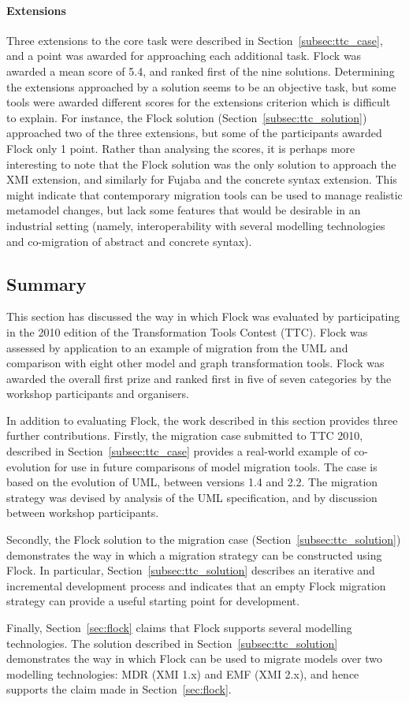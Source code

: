 \paragraph{Extensions} Three extensions to the core task were described in Section~\ref{subsec:ttc_case}, and a point was awarded for approaching each additional task. Flock was awarded a mean score of 5.4, and ranked first of the nine solutions. Determining the extensions approached by a solution seems to be an objective task, but some tools were awarded different scores for the extensions criterion which is difficult to explain. For instance, the Flock solution (Section~\ref{subsec:ttc_solution}) approached two of the three extensions, but some of the participants awarded Flock only 1 point. Rather than analysing the scores, it is perhaps more interesting to note that the Flock solution was the only solution to approach the XMI extension, and similarly for Fujaba \cite{fujaba} and the concrete syntax extension. This might indicate that contemporary migration tools can be used to manage realistic metamodel changes, but lack some features that would be desirable in an industrial setting (namely, interoperability with several modelling technologies and co-migration of abstract and concrete syntax).

\subsection{Summary}
This section has discussed the way in which Flock was evaluated by participating in the 2010 edition of the Transformation Tools Contest (TTC). Flock was assessed by application to an example of migration from the UML and comparison with eight other model and graph transformation tools. Flock was awarded the overall first prize and ranked first in five of seven categories by the workshop participants and organisers. 

In addition to evaluating Flock, the work described in this section provides three further contributions. Firstly, the migration case submitted to TTC 2010, described in Section~\ref{subsec:ttc_case} provides a real-world example of co-evolution for use in future comparisons of model migration tools. The case is based on the evolution of UML, between versions 1.4 and 2.2. The migration strategy was devised by analysis of the UML specification, and by discussion between workshop participants.


Secondly, the Flock solution to the migration case (Section~\ref{subsec:ttc_solution}) demonstrates the way in which a migration strategy can be constructed using Flock. In particular, Section~\ref{subsec:ttc_solution} describes an iterative and incremental development process and indicates that an empty Flock migration strategy can provide a useful starting point for development.

Finally, Section~\ref{sec:flock} claims that Flock supports several modelling technologies. The solution described in Section~\ref{subsec:ttc_solution} demonstrates the way in which Flock can be used to migrate models over two modelling technologies: MDR (XMI 1.x) and EMF (XMI 2.x), and hence supports the claim made in Section~\ref{sec:flock}.